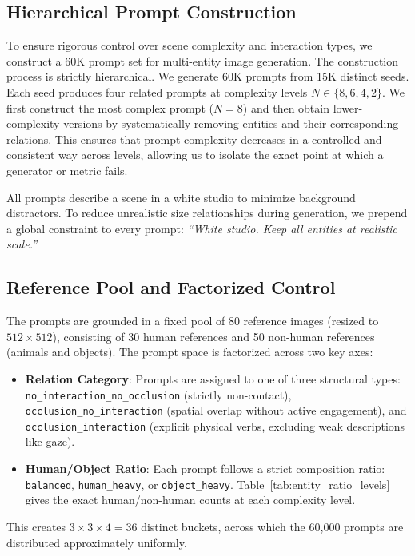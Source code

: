 \subsection{Hierarchical Prompt Construction}
To ensure rigorous control over scene complexity and interaction types, we construct a 60K prompt set for multi-entity image generation. The construction process is strictly hierarchical. We generate 60K prompts from 15K distinct seeds. Each seed produces four related prompts at complexity levels $N \in \{8, 6, 4, 2\}$. We first construct the most complex prompt ($N=8$) and then obtain lower-complexity versions by systematically removing entities and their corresponding relations. This ensures that prompt complexity decreases in a controlled and consistent way across levels, allowing us to isolate the exact point at which a generator or metric fails.

All prompts describe a scene in a white studio to minimize background distractors. To reduce unrealistic size relationships during generation, we prepend a global constraint to every prompt: \textit{``White studio. Keep all entities at realistic scale.''}

\subsection{Reference Pool and Factorized Control}
The prompts are grounded in a fixed pool of 80 reference images (resized to $512 \times 512$), consisting of 30 human references and 50 non-human references (animals and objects). The prompt space is factorized across two key axes:
\begin{itemize}
    \item \textbf{Relation Category}: Prompts are assigned to one of three structural types: \texttt{no\_interaction\_\allowbreak no\_occlusion} (strictly non-contact), \texttt{occlusion\_\allowbreak no\_interaction} (spatial overlap without active engagement), and \texttt{occlusion\_\allowbreak interaction} (explicit physical verbs, excluding weak descriptions like gaze).
    \item \textbf{Human/Object Ratio}: Each prompt follows a strict composition ratio:
    \texttt{balanced}, \texttt{human\_heavy}, or \texttt{object\_heavy}. Table~\ref{tab:entity_ratio_levels} gives the exact human/non-human counts at each complexity level.
\end{itemize}

This creates $3 \times 3 \times 4 = 36$ distinct buckets, across which the 60,000 prompts are distributed approximately uniformly.

